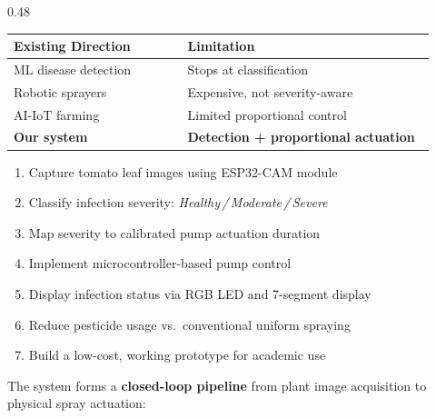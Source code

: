 \documentclass[final,t]{beamer}
\newcommand{\hlgood}[1]{\textbf{\textcolor{GreenGood}{#1}}}
\begin{document}
\begin{frame}[t]{}
\begin{columns}[T]
\begin{column}{0.48\textwidth}
\begin{posterbox}[title=2~~Research Gap]
\vspace{0.3em}
\begin{resultbox}
\renewcommand{\arraystretch}{1.3}
\centering
\begin{tabular}{p{0.38\linewidth}p{0.54\linewidth}}
\toprule
\textbf{Existing Direction} & \textbf{Limitation} \\
\midrule
ML disease detection & Stops at classification \\
Robotic sprayers & Expensive, not severity-aware \\
AI-IoT farming & Limited proportional control \\
\textbf{Our system} & \hlgood{Detection + proportional actuation} \\
\bottomrule
\end{tabular}
\end{resultbox}
\end{posterbox}

\vspace{0.4cm}

\begin{posterbox}[title=3~~Objectives, colbacktitle=AccentBlue]
\justifying
\begin{enumerate}
  \item Capture tomato leaf images using ESP32-CAM module
  \item Classify infection severity: \textit{Healthy\,/\,Moderate\,/\,Severe}
  \item Map severity to calibrated pump actuation duration
  \item Implement microcontroller-based pump control
  \item Display infection status via RGB LED and 7-segment display
  \item Reduce pesticide usage vs.\ conventional uniform spraying
  \item Build a low-cost, working prototype for academic use
\end{enumerate}
\end{posterbox}

\vspace{0.4cm}

\begin{posterbox}[title=4~~System Architecture]
\justifying
The system forms a \textbf{closed-loop pipeline} from plant image
acquisition to physical spray actuation:


\end{posterbox}
\end{column}
\end{columns}
\end{frame}
\end{document}
